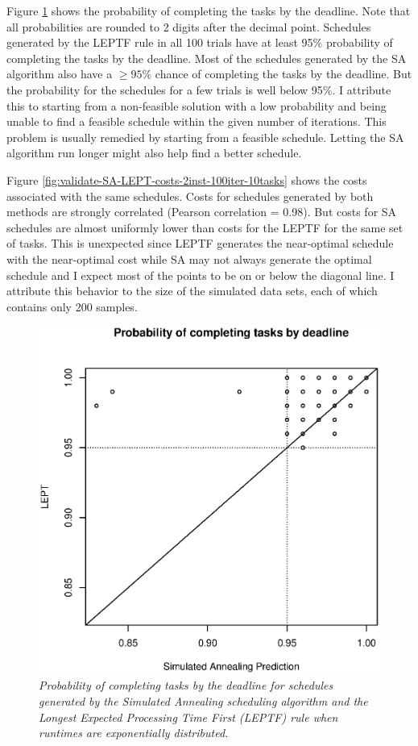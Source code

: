 \documentclass[12pt]{report}
\begin{document}
Figure \ref{fig:validate-SA-LEPT-scores-2inst-100iter-10tasks} shows the probability of completing the tasks by the deadline.
Note that all probabilities are rounded to 2 digits after the decimal point.
Schedules generated by the LEPTF rule in all 100 trials have at least 95\% probability of completing the tasks by the deadline.
Most of the schedules generated by the SA algorithm also have a $\geq 95\%$ chance of completing the tasks by the deadline.
But the probability for the schedules for a few trials is well below 95\%.
I attribute this to starting from a non-feasible solution with a low probability and being unable to find a feasible schedule within the given number of iterations.
This problem is usually remedied by starting from a feasible schedule.
Letting the SA algorithm run longer might also help find a better schedule.

Figure \ref{fig:validate-SA-LEPT-costs-2inst-100iter-10tasks} shows the costs associated with the same schedules. 
Costs for schedules generated by both methods are strongly correlated (Pearson correlation = 0.98).
But costs for SA schedules are almost uniformly lower than costs for the LEPTF for the same set of tasks.
This is unexpected since LEPTF generates the near-optimal schedule with the near-optimal cost while SA may not always generate the optimal schedule and I expect most of the points to be on or below the diagonal line.
I attribute this behavior to the size of the simulated data sets, each of which contains only 200 samples.

\begin{figure}
\includegraphics[width=1\textwidth]{validate-SA-LEPT-scores-2inst-100iter-10tasks.eps}
\caption{\textit{Probability of completing tasks by the deadline for schedules generated by the Simulated Annealing scheduling algorithm and the Longest Expected Processing Time First (LEPTF) rule when runtimes are exponentially distributed.}}
\label{fig:validate-SA-LEPT-scores-2inst-100iter-10tasks}
\end{figure}
\end{document}
